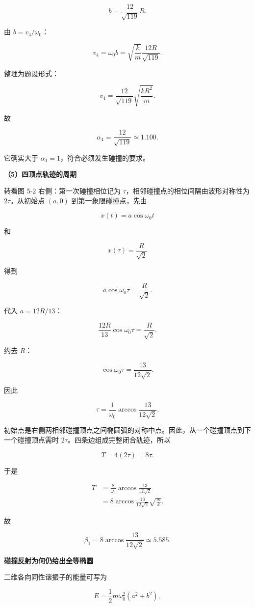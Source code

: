 \documentclass[12pt,a4paper,UTF8]{ctexart}
\begin{document}
\[
\boxed{b=\frac{12}{\sqrt{119}}R}.
\]

由 \(b=v_4/\omega_0\)：

\[
v_4=\omega_0b
=\sqrt{\frac{k}{m}}\frac{12R}{\sqrt{119}}.
\]

整理为题设形式：

\[
\boxed{
v_4=\frac{12}{\sqrt{119}}\sqrt{\frac{kR^2}{m}}
}.
\]

故

\[
\boxed{\alpha_4=\frac{12}{\sqrt{119}}\simeq1.100}.
\]

它确实大于 \(\alpha_1=1\)，符合必须发生碰撞的要求。

\textbf{（5）四顶点轨迹的周期}

转看图 5-2 右侧：第一次碰撞相位记为
\(\tau\)，相邻碰撞点的相位间隔由波形对称性为 \(2\tau\)。从初始点
\((a,0)\) 到第一象限碰撞点，先由

\[x(t)=a\cos\omega_0t\]

和

\[x(\tau)=\frac{R}{\sqrt2}\]

得到

\[
a\cos\omega_0\tau=\frac{R}{\sqrt2}.
\]

代入 \(a=12R/13\)：

\[
\frac{12R}{13}\cos\omega_0\tau=\frac{R}{\sqrt2}.
\]

约去 \(R\)：

\[
\cos\omega_0\tau=\frac{13}{12\sqrt2}.
\]

因此

\[
\boxed{
\tau=\frac1{\omega_0}\arccos\frac{13}{12\sqrt2}
}.
\]

初始点是右侧两相邻碰撞顶点之间椭圆弧的对称中点。因此，从一个碰撞顶点到下一个碰撞顶点需时
\(2\tau\)。四条边组成完整闭合轨迹，所以

\[
T=4(2\tau)=8\tau.
\]

于是

\[
\begin{aligned}
T
&=\frac8{\omega_0}\arccos\frac{13}{12\sqrt2}\\
&=8\arccos\frac{13}{12\sqrt2}\sqrt{\frac{m}{k}}.
\end{aligned}
\]

故

\[
\boxed{
\beta_1=8\arccos\frac{13}{12\sqrt2}
\simeq5.585
}.
\]

\textbf{碰撞反射为何仍给出全等椭圆}

二维各向同性谐振子的能量可写为

\[E=\frac12m\omega_0^2(a^2+b^2),\]
\end{document}
